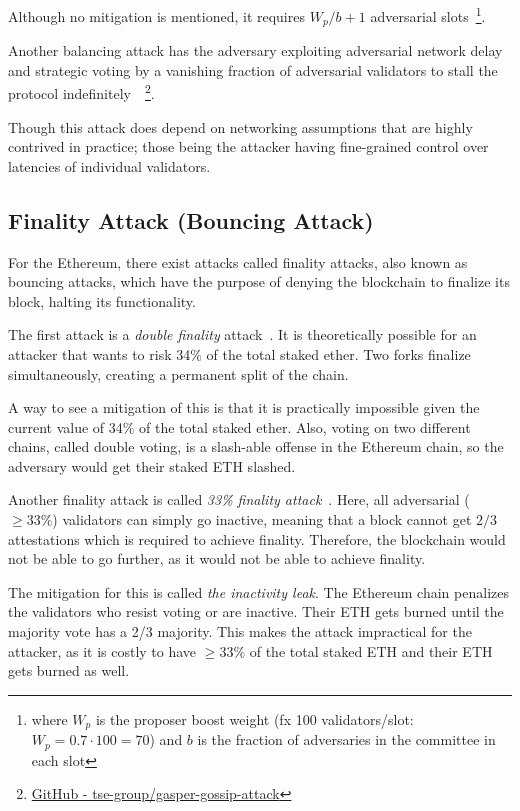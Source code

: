 Although no mitigation is mentioned,
it requires $W_p/b+1$ adversarial slots~\footnote{where $W_p$ is the proposer boost weight (fx 100 validators/slot: $W_p=0.7\cdot100=70$)
    and $b$ is the fraction of adversaries in the committee in each slot}.


Another balancing attack has the adversary
exploiting adversarial network delay
and strategic voting by a vanishing fraction of adversarial validators
to stall the protocol indefinitely~\cite{10.1007/978-3-031-18283-9_28}~\footnote{
\href{https://github.com/tse-group/gasper-gossip-attack}{GitHub - tse-group/gasper-gossip-attack}}.

Though this attack does depend on networking assumptions that are highly contrived in practice;
those being the attacker having fine-grained control over latencies of individual validators.

\subsection{Finality Attack (Bouncing Attack)}\label{subsec:finality-attack-(bouncing-attack)}
For the Ethereum, there exist attacks called finality attacks, also known as bouncing attacks,
which have the purpose of denying the blockchain to finalize its block, halting its functionality.

The first attack is a \textit{double finality} attack~\cite{EthereumAttackDefense2024, 10646904}.
It is theoretically possible for an attacker that wants to risk 34\% of the total staked ether.
Two forks finalize simultaneously, creating a permanent split of the chain.

A way to see a mitigation of this is
that it is practically impossible given the current value of 34\% of the total staked ether.
Also, voting on two different chains, called double voting, is a slash-able offense in the Ethereum chain,
so the adversary would get their staked ETH slashed.


Another finality attack is called \textit{33\% finality attack}~\cite{EthereumAttackDefense2024}.
Here, all adversarial ($\geq33\%$) validators can simply go inactive,
meaning that a block cannot get $2/3$ attestations which is required to achieve finality.
Therefore, the blockchain would not be able to go further, as it would not be able to achieve finality.

The mitigation for this is called \textit{the inactivity leak}.
The Ethereum chain penalizes the validators who resist voting or are inactive.
Their ETH gets burned until the majority vote has a 2/3 majority.
This makes the attack impractical for the attacker,
as it is costly to have $\geq33\%$ of the total staked ETH and their ETH gets burned as well.

